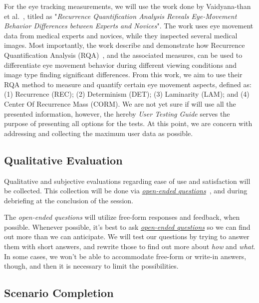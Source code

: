 For the eye tracking measurements, we will use the work done by Vaidyana-than et al.~\cite{vaidyanathan2014recurrence}, titled as "{\it Recurrence Quantification Analysis Reveals Eye-Movement Behavior Differences between Experts and Novices}". The work uses eye movement data from medical experts and novices, while they inspected several medical images. Most importantly, the work describe and demonstrate how Recurrence Quantification Analysis (RQA)~\cite{anderson2013recurrence}, and the associated measures, can be used to differentiate eye movement behavior during different viewing conditions and image type finding significant differences. From this work, we aim to use their RQA method to measure and quantify certain eye movement aspects, defined as: (1) Recurrence (REC); (2) Determinism (DET); (3) Laminarity (LAM); and (4) Center Of Recurrence Mass (CORM). We are not yet sure if will use all the presented information, however, the hereby {\it User Testing Guide} serves the purpose of presenting all options for the tests. At this point, we are concern with addressing and collecting the maximum user data as possible.

\subsection{Qualitative Evaluation}

Qualitative and subjective evaluations regarding ease of use and satisfaction will be collected. This collection will be done via {\it \hyperlink{https://www.nngroup.com/articles/open-ended-questions/}{open-ended questions}}~\cite{abelson2016supporting, merchant2018digital}, and during debriefing at the conclusion of the session.

The {\it open-ended questions} will utilize free-form responses and feedback, when possible. Whenever possible, it's best to ask {\it \hyperlink{https://www.nngroup.com/articles/open-ended-questions/}{open-ended questions}} so we can find out more than we can anticipate. We will test our questions by trying to answer them with short answers, and rewrite those to find out more about {\it how} and {\it what}. In some cases, we won't be able to accommodate free-form or write-in answers, though, and then it is necessary to limit the possibilities.

\subsection{Scenario Completion}


